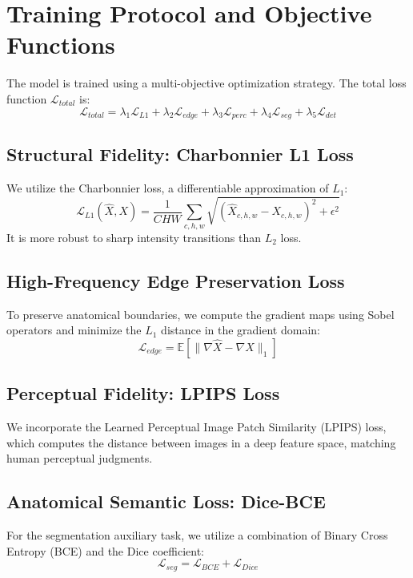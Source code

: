 \section{Training Protocol and Objective Functions}
The model is trained using a multi-objective optimization strategy. The total loss function $\mathcal{L}_{total}$ is:
\begin{equation}
    \mathcal{L}_{total} = \lambda_1 \mathcal{L}_{L1} + \lambda_2 \mathcal{L}_{edge} + \lambda_3 \mathcal{L}_{perc} + \lambda_4 \mathcal{L}_{seg} + \lambda_5 \mathcal{L}_{det}
\end{equation}

\subsection{Structural Fidelity: Charbonnier L1 Loss}
We utilize the Charbonnier loss, a differentiable approximation of $L_1$:
\begin{equation}
    \mathcal{L}_{L1}(\hat{X}, X) = \frac{1}{CHW} \sum_{c,h,w} \sqrt{(\hat{X}_{c,h,w} - X_{c,h,w})^2 + \epsilon^2}
\end{equation}
It is more robust to sharp intensity transitions than $L_2$ loss.

\subsection{High-Frequency Edge Preservation Loss}
To preserve anatomical boundaries, we compute the gradient maps using Sobel operators and minimize the $L_1$ distance in the gradient domain:
\begin{equation}
    \mathcal{L}_{edge} = \mathbb{E}[\|\nabla \hat{X} - \nabla X\|_1]
\end{equation}

\subsection{Perceptual Fidelity: LPIPS Loss}
We incorporate the Learned Perceptual Image Patch Similarity (LPIPS) loss, which computes the distance between images in a deep feature space, matching human perceptual judgments.

\subsection{Anatomical Semantic Loss: Dice-BCE}
For the segmentation auxiliary task, we utilize a combination of Binary Cross Entropy (BCE) and the Dice coefficient:
\begin{equation}
    \mathcal{L}_{seg} = \mathcal{L}_{BCE} + \mathcal{L}_{Dice}
\end{equation}

